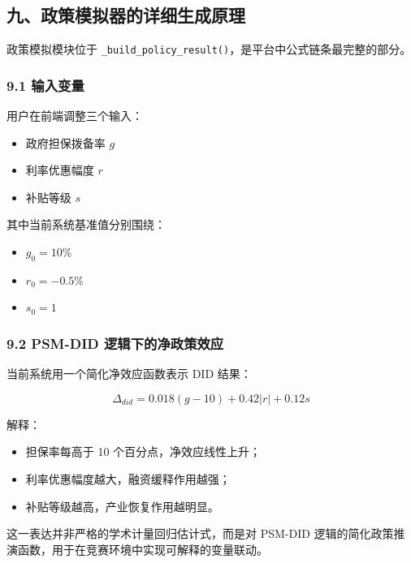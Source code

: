 \documentclass[
]{article}
\providecommand{\tightlist}{%
  \setlength{\itemsep}{0pt}\setlength{\parskip}{0pt}}
\begin{document}
\subsection{九、政策模拟器的详细生成原理}\label{ux4e5dux653fux7b56ux6a21ux62dfux5668ux7684ux8be6ux7ec6ux751fux6210ux539fux7406}

政策模拟模块位于
\texttt{\_build\_policy\_result()}，是平台中公式链条最完整的部分。

\subsubsection{9.1 输入变量}\label{ux8f93ux5165ux53d8ux91cf}

用户在前端调整三个输入：

\begin{itemize}
\tightlist
\item
  政府担保拨备率 \(g\)
\item
  利率优惠幅度 \(r\)
\item
  补贴等级 \(s\)
\end{itemize}

其中当前系统基准值分别围绕：

\begin{itemize}
\tightlist
\item
  \(g_0 = 10\%\)
\item
  \(r_0 = -0.5\%\)
\item
  \(s_0 = 1\)
\end{itemize}

\subsubsection{9.2 PSM-DID
逻辑下的净政策效应}\label{psm-did-ux903bux8f91ux4e0bux7684ux51c0ux653fux7b56ux6548ux5e94}

当前系统用一个简化净效应函数表示 DID 结果：

\[
\Delta_{did} = 0.018(g-10) + 0.42|r| + 0.12s
\]

解释：

\begin{itemize}
\tightlist
\item
  担保率每高于 10 个百分点，净效应线性上升；
\item
  利率优惠幅度越大，融资缓释作用越强；
\item
  补贴等级越高，产业恢复作用越明显。
\end{itemize}

这一表达并非严格的学术计量回归估计式，而是对 PSM-DID
逻辑的简化政策推演函数，用于在竞赛环境中实现可解释的变量联动。
\end{document}
